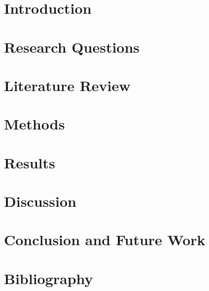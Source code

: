 \documentclass[acmlarge,screen]{acmart}
\begin{document}
%

%

%
\maketitle

\newpage
\section{Introduction}


\newpage
\section{Research Questions}


\newpage
\section{Literature Review}


\newpage
\section{Methods}







\newpage
\section{Results}


\newpage
\section{Discussion}

\newpage
\section{Conclusion and Future Work}

\newpage
\section{Bibliography}


\newpage
\end{document}
